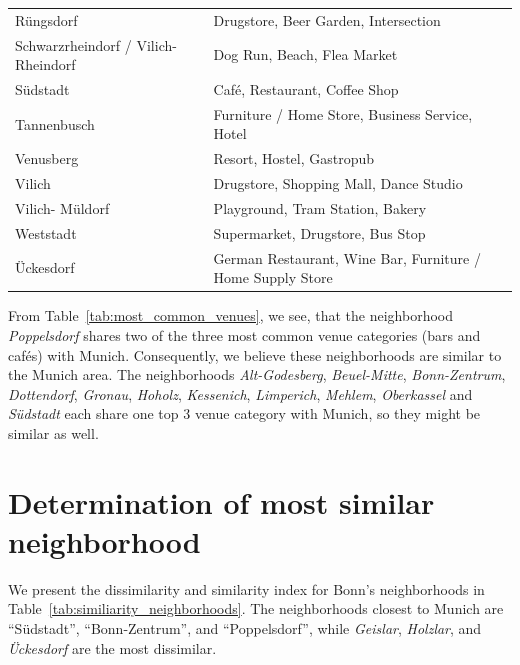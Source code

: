 \documentclass[UKenglish]{scrreprt}
\begin{document}
\begin{table}
\begin{longtable}{ll}
	Rüngsdorf                           &             Drugstore, Beer Garden, Intersection \\
	Schwarzrheindorf / Vilich-Rheindorf &                      Dog Run, Beach, Flea Market \\
	Südstadt                            &                    Café, Restaurant, Coffee Shop \\
	Tannenbusch                         &  Furniture / Home Store, Business Service, Hotel \\
	Venusberg                           &                        Resort, Hostel, Gastropub \\
	Vilich                              &           Drugstore, Shopping Mall, Dance Studio \\
	Vilich- Müldorf                     &                 Playground, Tram Station, Bakery \\
	Weststadt                           &                 Supermarket, Drugstore, Bus Stop \\
	Ückesdorf                           &  German Restaurant, Wine Bar, Furniture / Home Supply Store \\
	\bottomrule
\end{longtable}
	
\end{table}

From Table~\ref{tab:most_common_venues}, we see, that the neighborhood \emph{Poppelsdorf} shares two of the three most common venue categories (bars and cafés) with Munich. Consequently, we believe these neighborhoods are similar to the Munich area. The neighborhoods \emph{Alt-Godesberg}, \emph{Beuel-Mitte}, \emph{Bonn-Zentrum}, \emph{Dottendorf}, \emph{Gronau}, \emph{Hoholz}, \emph{Kessenich}, \emph{Limperich}, \emph{Mehlem}, \emph{Oberkassel} and \emph{Südstadt} each share one top 3 venue category with Munich, so they might be similar as well.

\section{Determination of most similar neighborhood}
We present the dissimilarity and similarity index for Bonn's neighborhoods in Table~\ref{tab:similiarity_neighborhoods}. The neighborhoods closest to Munich are \enquote{Südstadt}, \enquote{Bonn-Zentrum}, and \enquote{Poppelsdorf}, while \emph{Geislar}, \emph{Holzlar}, and \emph{Ückesdorf} are the most dissimilar. 
\end{document}
